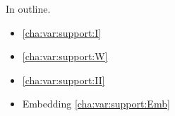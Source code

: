 \begin{note}
  In outline.
  \begin{itemize}
  \item
    \supportI{} \hfill \autoref{cha:var:support:I}
  \item
    \wit{} \hfill \autoref{cha:var:support:W}
  \item
    \supportII{} \hfill \autoref{cha:var:support:II}
  \item
    Embedding \hfill \autoref{cha:var:support:Emb}
  \end{itemize}
\end{note}

\subsection{\supportI{}}
\label{cha:var:support:I}

